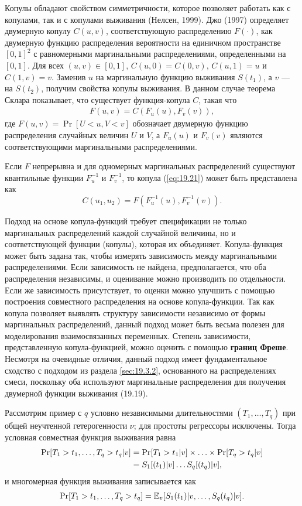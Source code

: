 Копулы обладают свойством симметричности, которое позволяет работать как с копулами, так и с копулами выживания (Нелсен, 1999). Джо (1997) определяет двумерную копулу $C(u, v)$, соответствующую распределению $F(\cdot)$, как двумерную функцию распределения вероятности на единичном пространстве $[0, 1]^2$ с равномерными маргинальными распределениями, определенными на $[0, 1]$. Для всех $(u, v) \in [0, 1]$, $C(u, 0) = C(0, v)$, $C(u, 1) = u$ и $C(1,v) = v$. Заменив $u$ на маргинальную функцию выживания $S(t_1)$, а $v$ --- на $S(t_2)$, получим свойства копулы выживания. В данном случае теорема Склара показывает, что существует функция-копула $C$, такая что
    \begin{align}\label{eq:19.21}
    F(u,v) = C(F_u(u), F_v(v)),
    \end{align}
где $F(u, v) = \Pr[U < u, V < v]$ обозначает двумерную функцию распределения случайных величин $U$ и $V$, а $F_u(u)$ и $F_v(v)$ являются соответствующими маргинальными распределениями.

Если $F$ непрерывна и для одномерных маргинальных распределений существуют квантильные функции $F_{u}^{-1}$ и $F_{v}^{-1}$, то копула (\ref{eq:19.21}) может быть представлена как
    $$C(u_1,u_2) = F(F^{-1}_u(u), F^{-1}_v(v)).$$

Подход на основе копула-функций требует спецификации не только маргинальных распределений каждой случайной величины, но и соответствующей функции (копулы), которая их объединяет. Копула-функция может быть задана так, чтобы измерять зависимость между маргинальными распределениями. Если зависимость не найдена, предполагается, что оба распределения независимы, и оценивание можно производить по отдельности. Если же зависимость присутствует, то оценки можно улучшить с помощью построения совместного распределения на основе копула-функции. Так как копула позволяет выявлять структуру зависимости независимо от формы маргинальных распределений, данный подход может быть весьма полезен для моделирования взаимосвязанных переменных. Степень зависимости, представленную копула-функцией, можно оценить с помощью \textbf{границ Фреше}. Несмотря на очевидные отличия, данный подход имеет фундаментальное сходство с подходом из раздела \ref{sec:19.3.2}, основанного на распределениях смеси, поскольку оба используют маргинальные распределения для получения двумерной функции выживания (19.19).

Рассмотрим пример с $q$ условно независимыми длительностями $(T_1, \ldots , T_q)$ при общей неучтенной гетерогенности $\nu$; для простоты регрессоры исключены. Тогда условная совместная функция выживания равна
    \begin{align}
    \Pr[T_1>t_1, \ldots  , T_q>t_q|v]   &= \Pr[T_1>t_1|v] \times \ldots  \times \Pr[T_q>t_q|v] \notag \\
                                    &= S_1[(t_1)|v]\ldots S_q[(t_q)|v], \notag
    \end{align}
и многомерная функция выживания записывается как
    \begin{align}\label{eq:19.22}
    \Pr[T_1>t_1, \ldots  , T_q>t_q] = \E_v[S_1(t_1)|v, \ldots  , S_q(t_q)|v].
    \end{align}


